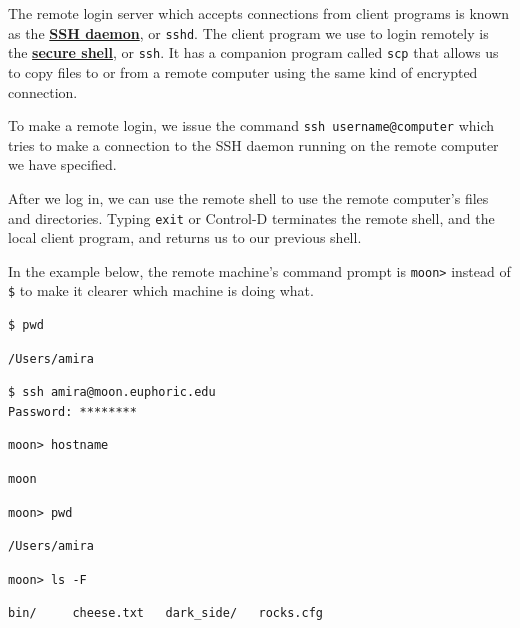 \documentclass[
]{krantz}
\newcommand{\gref}[2]{\hyperlink{#2}{\textbf{#1}}}
\begin{document}
The remote login server which accepts connections from client programs
is known as the \gref{SSH daemon}{ssh\_daemon}, or \texttt{sshd}.
The client program we use to login remotely is the \gref{secure shell}{ssh},
or \texttt{ssh}.
It has a companion program called \texttt{scp}
that allows us to copy files to or from a remote computer using the same kind of encrypted connection.

To make a remote login, we issue the command \texttt{ssh\ username@computer}
which tries to make a connection to the SSH daemon running on the remote computer we have specified.

After we log in,
we can use the remote shell to use the remote computer's files and directories.
Typing \texttt{exit} or Control-D
terminates the remote shell, and the local client program, and returns us to our previous shell.

In the example below,
the remote machine's command prompt is \texttt{moon\textgreater{}}
instead of \texttt{\$} to make it clearer which machine is doing what.

\begin{verbatim}
$ pwd
\end{verbatim}

\begin{verbatim}
/Users/amira
\end{verbatim}

\begin{verbatim}
$ ssh amira@moon.euphoric.edu
Password: ********
\end{verbatim}

\begin{verbatim}
moon> hostname
\end{verbatim}

\begin{verbatim}
moon
\end{verbatim}

\begin{verbatim}
moon> pwd
\end{verbatim}

\begin{verbatim}
/Users/amira
\end{verbatim}

\begin{verbatim}
moon> ls -F
\end{verbatim}

\begin{verbatim}
bin/     cheese.txt   dark_side/   rocks.cfg
\end{verbatim}
\end{document}
